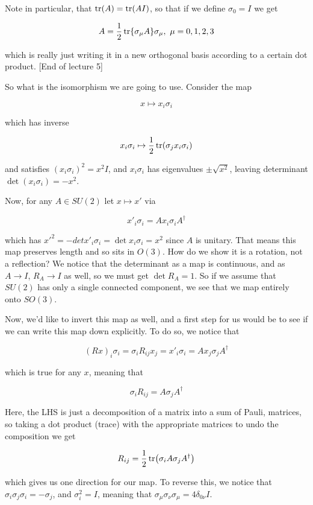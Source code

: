 \documentclass{article}
\theoremstyle{definition}
\begin{document}
Note in particular, that $\tr(A) = \tr(AI)$, so that if we define $\sigma_0 = I$
we get

$$ A = \frac{1}{2} \tr{\sigma_\mu A} \sigma_\mu, \,\, \mu = 0, 1, 2, 3 $$

which is really just writing it in a new orthogonal basis according to a certain
dot product. [End of lecture 5]

So what is the isomorphism we are going to use. Consider the map

$$ x \mapsto x_i \sigma_i $$

which has inverse

$$ x_i \sigma_i \mapsto \frac{1}{2} \tr(\sigma_j x_i \sigma_i) $$

and satisfies $(x_i \sigma_i)^2 = x^2 I$, and $x_i \sigma_i$ has eigenvalues
$\pm\sqrt{x^2}$, leaving determinant $\det(x_i \sigma_i) = -x^2$.

Now, for any $A \in SU(2)$ let $x \mapsto x'$ via

$$ x'_i \sigma_i = Ax_i \sigma_i A^\dagger $$

which has $x'^2 = -det{x'_i \sigma_i} = \det{x_i \sigma_i} = x^2$ since $A$ is
unitary. That means this map preserves length and so sits in $O(3)$. How do we
show it is a rotation, not a reflection? We notice that the determinant as a map
is continuous, and as $A \to I$, $R_A \to I$ as well, so we must get $\det{R_A}
= 1$. So if we assume that $SU(2)$ has only a single connected component, we see
that we map entirely onto $SO(3)$.

Now, we'd like to invert this map as well, and a first step for us would be to
see if we can write this map down explicitly. To do so, we notice that

$$ (Rx)_i \sigma_i = \sigma_i R_{ij} x_j = x'_i \sigma_i = Ax_j \sigma_j
A^\dagger $$

which is true for any $x$, meaning that

$$ \sigma_i R_{ij} = A \sigma_j A^\dagger $$

Here, the LHS is just a decomposition of a matrix into a sum of Pauli, matrices,
so taking a dot product (trace) with the appropriate matrices to undo the
composition we get

$$ R_{ij} = \frac{1}{2} \tr(\sigma_i A \sigma_j A^\dagger) $$

which gives us one direction for our map. To reverse this, we notice that
$\sigma_i \sigma_j \sigma_i = -\sigma_j$, and $\sigma_i^2 = I$, meaning that
$\sigma_\mu \sigma_\nu \sigma_\mu = 4\delta_{0 \nu} I$. 
\end{document}
